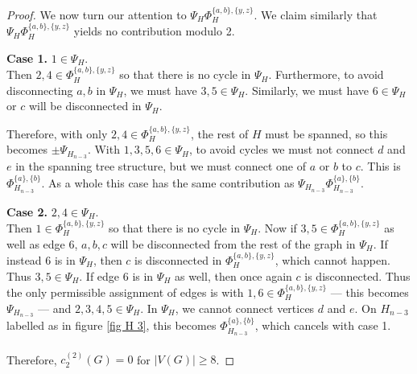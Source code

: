 \documentclass[12pt]{amsart}
\numberwithin{definition}{section}
\begin{document}
\begin{proof}
	We now turn our attention to $\Psi_H\Phi_H^{\{a,b\},\{y,z\}}$. We claim similarly that $\Psi_H\Phi_H^{\{a,b\},\{y,z\}}$ yields no contribution modulo 2.

\medskip
        
	\textbf{Case 1.} $1\in \Psi_H$. \\
	Then $2,4 \in \Phi_H^{\{a,b\},\{y,z\}}$ so that there is no cycle in $\Psi_H$. Furthermore, to avoid disconnecting $a,b$ in $\Psi_H$, we must have $3,5\in \Psi_H$. Similarly, we must have $6\in \Psi_H$ or $c$ will be disconnected in $\Psi_H$.
        
	Therefore, with only $2,4\in \Phi_H^{\{a,b\},\{y,z\}}$, the rest of $H$ must be spanned, so this becomes $\pm \Psi_{H_{n-3}}$. With $1,3,5,6 \in \Psi_H$, to avoid cycles we must not connect $d$ and $e$ in the spanning tree structure, but we must connect one of $a$ or $b$ to $c$. This is $\Phi_{H_{n-3}}^{\{a\},\{b\}}$.  As a whole this case has the same contribution as $\Psi_{H_{n-3}}\Phi^{\{a\}, \{b\}}_{H_{n-3}}$.

\medskip
        
	\textbf{Case 2.} $2,4\in \Psi_H$. \\
	Then $1\in \Phi_H^{\{a,b\},\{y,z\}}$ so that there is no cycle in $\Psi_H$. Now if $3,5\in \Phi_H^{\{a,b\},\{y,z\}}$ as well as edge 6, $a,b,c$ will be disconnected from the rest of the graph in $\Psi_H$. If instead 6 is in $\Psi_H$, then $c$ is disconnected in $\Phi_H^{\{a,b\},\{y,z\}}$, which cannot happen. Thus $3,5\in \Psi_H$. If edge 6 is in $\Psi_H$ as well, then once again $c$ is disconnected. Thus the only permissible assignment of edges is with $1,6\in \Phi_H^{\{a,b\},\{y,z\}}$ --- this becomes $\Psi_{H_{n-3}}$ --- and $2,3,4,5 \in \Psi_H$. In $\Psi_H$, we cannot connect vertices $d$ and $e$. On $H_{n-3}$ labelled as in figure \ref{fig H 3}, this becomes $\Phi_{H_{n-3}}^{\{a\},\{b\}}$, which cancels with case 1. \\ \\
	Therefore, $c_2^{(2)}(G)=0$ for $|V(G)|\geq8$.
\end{proof}
\end{document}
